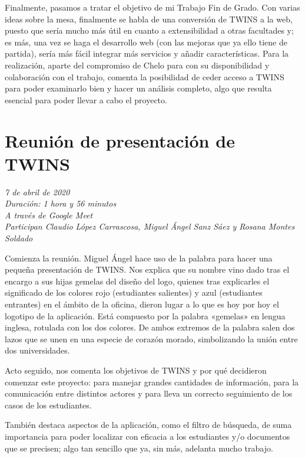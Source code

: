 \begin{appendices}
	Finalmente, pasamos a tratar el objetivo de mi Trabajo Fin de Grado. Con varias ideas sobre la mesa, finalmente se habla de una conversión de TWINS a la web, puesto que sería mucho más útil en cuanto a extensibilidad a otras facultades y; es más, una vez se haga el desarrollo web (con las mejoras que ya ello tiene de partida), sería más fácil integrar más servicios y añadir características. Para la realización, aparte del compromiso de Chelo para con su disponibilidad y colaboración con el trabajo, comenta la posibilidad de ceder acceso a TWINS para poder examinarlo bien y hacer un análisis completo, algo que resulta esencial para poder llevar a cabo el proyecto.
	
	\section*{Reunión de presentación de TWINS}
	\label{reunion3}
	
	\textit{7 de abril de 2020}\\
	
	\textit{Duración: 1 hora y 56 minutos}\\
	
	\textit{A través de Google Meet}\\
	
	\textit{Participan Claudio López Carrascosa, Miguel Ángel Sanz Sáez y Rosana Montes Soldado}
	
	Comienza la reunión. Miguel Ángel hace uso de la palabra para hacer una pequeña presentación de TWINS. Nos explica que su nombre vino dado tras el encargo a sus hijas gemelas del diseño del logo, quienes tras explicarles el significado de los colores rojo (estudiantes salientes) y azul (estudiantes entrantes) en el ámbito de la oficina, dieron lugar a lo que es hoy por hoy el logotipo de la aplicación. Está compuesto por la palabra «gemelas» en lengua inglesa, rotulada con los dos colores. De ambos extremos de la palabra salen dos lazos que se unen en una especie de corazón morado, simbolizando la unión entre dos universidades.
	
	Acto seguido, nos comenta los objetivos de TWINS y por qué decidieron comenzar este proyecto: para manejar grandes cantidades de información, para la comunicación entre distintos actores y para lleva un correcto seguimiento de los casos de los estudiantes.
	
	También destaca aspectos de la aplicación, como el filtro de búsqueda, de suma importancia para poder localizar con eficacia a los estudiantes y/o documentos que se precisen; algo tan sencillo que ya, sin más, adelanta mucho trabajo.
	

\end{appendices}

